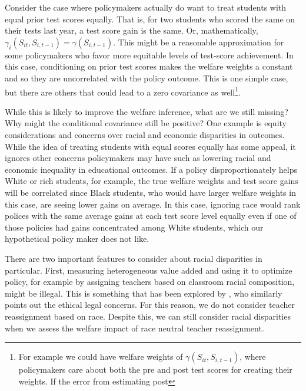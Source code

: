 \documentclass[12pt]{article}
\theoremstyle{definition}
\theoremstyle{definition}
\theoremstyle{definition}
\theoremstyle{definition}
\begin{document}
    Consider the case where policymakers actually do want to treat students with equal prior test scores equally. That is, for two students who scored the same on their tests last year, a test score gain is the same. Or, mathematically, $\gamma_i(S_{it}, S_{i,t-1}) = \gamma(S_{i,t-1})$. This might be a reasonable approximation for some policymakers who favor more equitable levels of test-score achievement. In this case, conditioning on prior test scores makes the welfare weights a constant and so they are uncorrelated with the policy outcome. This is one simple case, but there are others that could lead to a zero covariance as well\footnote{For example we could have welfare weights of $\gamma(S_{it}, S_{i,t-1})$, where policymakers care about both the pre and post test scores for creating their weights. If the error from estimating post }.  
    
    While this is likely to improve the welfare inference, what are we still missing? Why might the conditional covariance still be positive? One example is equity considerations and concerns over racial and economic disparities in outcomes. While the idea of treating students with equal scores equally has some appeal, it ignores other concerns policymakers may have such as lowering racial and economic inequality in educational outcomes. If a policy disproportionately helps White or rich students, for example, the true welfare weights and test score gains will be correlated since Black students, who would have larger welfare weights in this case, are seeing lower gains on average. In this case, ignoring race would rank polices with the same average gains at each test score level equally even if one of those policies had gains concentrated among White students, which our hypothetical policy maker does not like.

    There are two important features to consider about racial disparities in particular. First, measuring heterogeneous value added and using it to optimize policy, for example by assigning teachers based on classroom racial composition, might be illegal. This is something that has been explored by \citet{Delgado2020}, who similarly points out the ethical legal concerns. For this reason, we do not consider teacher reassignment based on race. Despite this, we can still consider racial disparities when we assess the welfare impact of race neutral teacher reassignment. 
    
\end{document}
